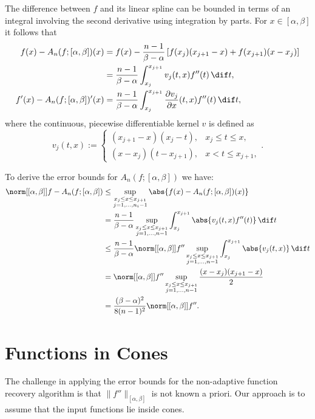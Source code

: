 \documentclass[]{elsarticle}
\theoremstyle{definition}
\theoremstyle{remark}
\begin{document}
The difference between $f$ and its linear spline can be bounded in terms of an integral involving the second derivative using integration by parts.  For $x \in [\alpha,\beta]$ it follows that
\begin{align}
f(x)-A_n(f;[\alpha,\beta])(x)
&= f(x) - \frac{n-1}{\beta-\alpha} \left[f(x_{j})(x_{j+1}-x) +f(x_{j+1})(x-x_j) \right] \nonumber\\
& = \frac{n-1}{\beta-\alpha}\int_{x_j}^{x_{j+1}} v_j(t,x) f''(t) \, \dif t, \label{fintermsfdoubprime}\\
f'(x)-A_n(f;[\alpha,\beta])'(x) & = \frac{n-1}{\beta-\alpha} \int_{x_j}^{x_{j+1}} \frac{\partial v_j}{\partial x}(t,x) f''(t) \, \dif t, \label{fprimeintermsfdoubprime}
\end{align}
where the continuous, piecewise differentiable kernel $v$ is defined as
\begin{equation*}
v_j(t,x) :=\begin{cases} (x_{j+1}-x)(x_j-t), & x_j\leq t\leq x,\\
(x-x_{j})(t- x_{j+1}), & x< t \leq x_{j+1},
\end{cases}.
\end{equation*}

To derive the error bounds for $A_{n}(f;[\alpha,\beta])$ we have:
\begin{align}
\norm[{[\alpha,\beta]}]{f-A_{n}(f;[\alpha,\beta])}
& \le \sup_{\substack{x_j \le x \le x_{j+1}\\ j=1, \ldots, n_i-1 }} \abs{f(x)-A_{n}(f;[\alpha,\beta])(x)}\nonumber\\
&= \frac{n-1}{\beta-\alpha} \sup_{\substack{x_j \le x \le x_{j+1}\\ j=1, \ldots, n-1 }}  \int_{x_j}^{x_{j+1}} \abs{v_j(t,x) f''(t)} \, \dif t \nonumber\\
&\le \frac{n-1}{\beta-\alpha} \norm[{[\alpha, \beta]}]{f''} \sup_{\substack{x_j \le x \le x_{j+1}\\ j=1, \ldots, n-1 }}  \int_{x_j}^{x_{j+1}} \abs{v_j(t,x)} \, \dif t\nonumber\\
&=\norm[{[\alpha, \beta]}]{f''} \sup_{\substack{x_j \le x \le x_{j+1}\\ j=1, \ldots, n-1 }}  \frac{(x-x_j)(x_{j+1}-x)}2 \nonumber \\
&= \frac{(\beta-\alpha)^2}{8(n-1)^2} \norm[{[\alpha, \beta]}]{f''}. \label{fdoubprimenorm}
\end{align}

\section{Functions in Cones}
The challenge in applying the error bounds for the non-adaptive function recovery algorithm is that $ \bigl \lVert f'' \bigr \rVert_{[\alpha,\beta]} $ is not known a priori.  Our approach is to assume that the input functions lie inside cones.
\end{document}
